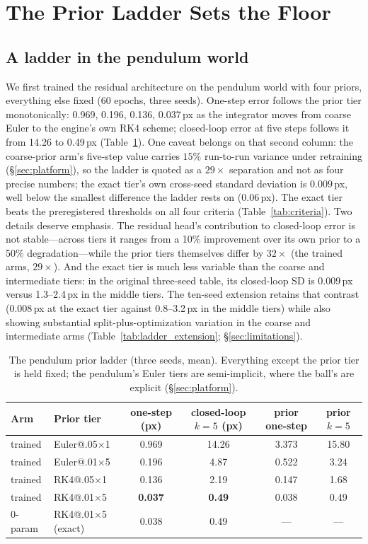 \documentclass{article}
\begin{document}
\section{The Prior Ladder Sets the Floor}\label{sec:floor}

\subsection{A ladder in the pendulum world}

We first trained the residual architecture on the pendulum world with four priors, everything else fixed (60 epochs, three seeds). One-step error follows the prior tier monotonically: 0.969, 0.196, 0.136, 0.037\,px as the integrator moves from coarse Euler to the engine's own RK4 scheme; closed-loop error at five steps follows it from 14.26 to 0.49\,px (Table~\ref{tab:ladder}). One caveat belongs on that second column: the coarse-prior arm's five-step value carries $15\%$ run-to-run variance under retraining (\S\ref{sec:platform}), so the ladder is quoted as a $29\times$ separation and not as four precise numbers; the exact tier's own cross-seed standard deviation is $0.009$\,px, well below the smallest difference the ladder rests on ($0.06$\,px). The exact tier beats the preregistered thresholds on all four criteria (Table~\ref{tab:criteria}). Two details deserve emphasis. The residual head's contribution to closed-loop error is not stable---across tiers it ranges from a 10\% improvement over its own prior to a 50\% degradation---while the prior tiers themselves differ by $32\times$ (the trained arms, $29\times$). And the exact tier is much less variable than the coarse and intermediate tiers: in the original three-seed table, its closed-loop SD is 0.009\,px versus 1.3--2.4\,px in the middle tiers. The ten-seed extension retains that contrast (0.008\,px at the exact tier against 0.8--3.2\,px in the middle tiers) while also showing substantial split-plus-optimization variation in the coarse and intermediate arms (Table~\ref{tab:ladder_extension}; \S\ref{sec:limitations}).

\begin{table}[t]
\centering
\caption{The pendulum prior ladder (three seeds, mean). Everything except the prior tier is held fixed; the pendulum's Euler tiers are semi-implicit, where the ball's are explicit (\S\ref{sec:platform}).}
\label{tab:ladder}
\small
\begin{tabular}{llcccc}
\toprule
Arm & Prior tier & one-step (px) & closed-loop $k{=}5$ (px) & prior one-step & prior $k{=}5$ \\
\midrule
trained & Euler@.05$\times$1  & 0.969 & 14.26 & 3.373 & 15.80 \\
trained & Euler@.01$\times$5  & 0.196 & 4.87  & 0.522 & 3.24 \\
trained & RK4@.05$\times$1    & 0.136 & 2.19  & 0.147 & 1.68 \\
trained & RK4@.01$\times$5    & \textbf{0.037} & \textbf{0.49} & 0.038 & 0.49 \\
\midrule
0-param & RK4@.01$\times$5 (exact) & 0.038 & 0.49 & --- & --- \\
\bottomrule
\end{tabular}
\end{table}
\end{document}
